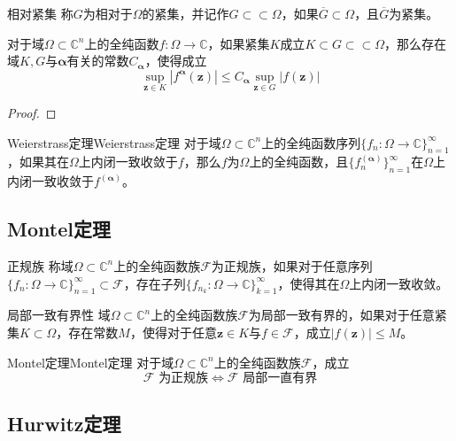 \documentclass[lang = cn, scheme = chinese, thmcnt = section]{elegantbook}
\newcommand{\C}{\mathbb{C}}  		   %
\newcommand{\sub}{\subset}             %
\newcommand{\bs}{\boldsymbol}          %
\begin{document}
\begin{definition}{相对紧集}
	称$G$为相对于$\Omega$的紧集，并记作$G\sub\sub \Omega$，如果$\overline{G}\sub\Omega$，且$\overline{G}$为紧集。
\end{definition}

\begin{theorem}
	对于域$\Omega\sub\C^n$上的全纯函数$f:\Omega\to\C$，如果紧集$K$成立$K\sub G\sub\sub \Omega$，那么存在域$K,G$与$\bs{\alpha}$有关的常数$C_{\bs{\alpha}}$，使得成立
	$$
	\sup_{\bs{z}\in K}|f^{\bs{\alpha}}(\bs{z})|
	\le C_{\bs{\alpha}}\sup_{\bs{z}\in G}|f(\bs{z})|
	$$
\end{theorem}

\begin{proof}
	
\end{proof}

\begin{theorem}{Weierstrass定理}{Weierstrass定理}
	对于域$\Omega\sub\C^n$上的全纯函数序列$\{f_n:\Omega\to\C\}_{n=1}^{\infty}$，如果其在$\Omega$上内闭一致收敛于$f$，那么$f$为$\Omega$上的全纯函数，且$\{f_n^{(\bs{\alpha})}\}_{n=1}^{\infty}$在$\Omega$上内闭一致收敛于$f^{(\bs{\alpha})}$。
\end{theorem}

\subsection{Montel定理}

\begin{definition}{正规族}
	称域$\Omega\sub\C^n$上的全纯函数族$\mathscr{F}$为正规族，如果对于任意序列$\{f_n:\Omega\to\C\}_{n=1}^{\infty}\sub \mathscr{F}$，存在子列$\{f_{n_k}:\Omega\to\C\}_{k=1}^{\infty}$，使得其在$\Omega$上内闭一致收敛。
\end{definition}

\begin{definition}{局部一致有界性}
	域$\Omega\sub\C^n$上的全纯函数族$\mathscr{F}$为局部一致有界的，如果对于任意紧集$K\sub\Omega$，存在常数$M$，使得对于任意$\bs{z}\in K$与$f\in\mathscr{F}$，成立$|f(\bs{z})|\le M$。
\end{definition}

\begin{theorem}{Montel定理}{Montel定理}
	对于域$\Omega\sub\C^n$上的全纯函数族$\mathscr{F}$，成立
	$$
	\mathscr{F}\text{ 为正规族}
	\iff 
	\mathscr{F}\text{ 局部一直有界}
	$$
\end{theorem}

\subsection{Hurwitz定理}
\end{document}
